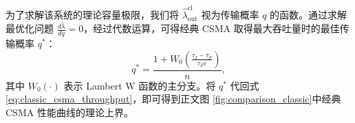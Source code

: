 为了求解该系统的理论容量极限，我们将 $\hat{\lambda}_{\text{out}}^{\text{cl}}$ 视为传输概率 $q$ 的函数。通过求解最优化问题 $\frac{d \hat{\lambda}}{d q} = 0$，经过代数运算，可得经典 CSMA 取得最大吞吐量时的最佳传输概率 $q^{*}$：
\begin{equation}
	\label{eq:optimal_q_classic}
	q^{*} = \frac{1 + W_{0}\left(\frac{\tau_{I}-\tau_{F}}{\tau_{F} e}\right)}{n},
\end{equation}
其中 $W_0(\cdot)$ 表示 Lambert W 函数的主分支。将 $q^{*}$ 代回式 \eqref{eq:classic_csma_throughput}，即可得到正文图 \ref{fig:comparison_classic}中经典 CSMA 性能曲线的理论上界。